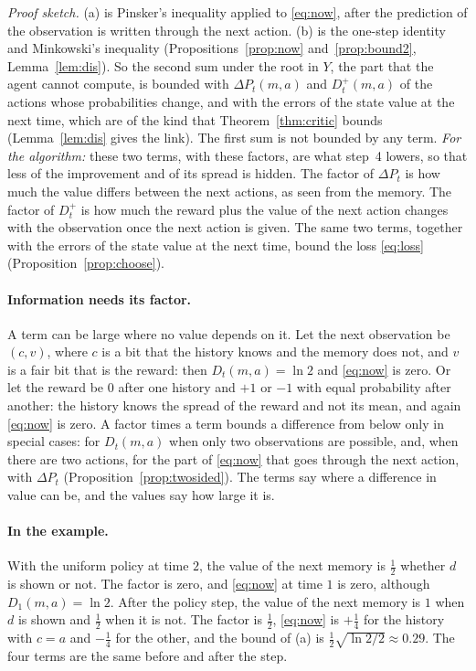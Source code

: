 \documentclass{article}
\newcounter{algo}
\theoremstyle{definition}
\newcommand{\dP}{\Delta P}
\begin{document}
\emph{Proof sketch.} (a) is Pinsker's inequality applied to \eqref{eq:now}, after the prediction of the observation is written through the next action. (b) is the one-step identity and Minkowski's inequality (Propositions~\ref{prop:now} and~\ref{prop:bound2}, Lemma~\ref{lem:dis}). So the second sum under the root in $Y$, the part that the agent cannot compute, is bounded with $\dP_t(m,a)$ and $D^+_t(m,a)$ of the actions whose probabilities change, and with the errors of the state value at the next time, which are of the kind that Theorem~\ref{thm:critic} bounds (Lemma~\ref{lem:dis} gives the link). The first sum is not bounded by any term. \emph{For the algorithm:} these two terms, with these factors, are what step~4 lowers, so that less of the improvement and of its spread is hidden. The factor of $\dP_t$ is how much the value differs between the next actions, as seen from the memory. The factor of $D^+_t$ is how much the reward plus the value of the next action changes with the observation once the next action is given. The same two terms, together with the errors of the state value at the next time, bound the loss \eqref{eq:loss} (Proposition~\ref{prop:choose}).

\paragraph{Information needs its factor.} A term can be large where no value depends on it. Let the next observation be $(c,v)$, where $c$ is a bit that the history knows and the memory does not, and $v$ is a fair bit that is the reward: then $D_t(m,a)=\ln2$ and \eqref{eq:now} is zero. Or let the reward be $0$ after one history and $+1$ or $-1$ with equal probability after another: the history knows the spread of the reward and not its mean, and again \eqref{eq:now} is zero. A factor times a term bounds a difference from below only in special cases: for $D_t(m,a)$ when only two observations are possible, and, when there are two actions, for the part of \eqref{eq:now} that goes through the next action, with $\dP_t$ (Proposition~\ref{prop:twosided}). The terms say where a difference in value can be, and the values say how large it is.

\paragraph{In the example.} With the uniform policy at time $2$, the value of the next memory is $\tfrac12$ whether $d$ is shown or not. The factor is zero, and \eqref{eq:now} at time $1$ is zero, although $D_1(m,a)=\ln2$. After the policy step, the value of the next memory is $1$ when $d$ is shown and $\tfrac12$ when it is not. The factor is $\tfrac12$, \eqref{eq:now} is $+\tfrac14$ for the history with $c=a$ and $-\tfrac14$ for the other, and the bound of (a) is $\tfrac12\sqrt{\ln2/2}\approx0.29$. The four terms are the same before and after the step.
\end{document}
